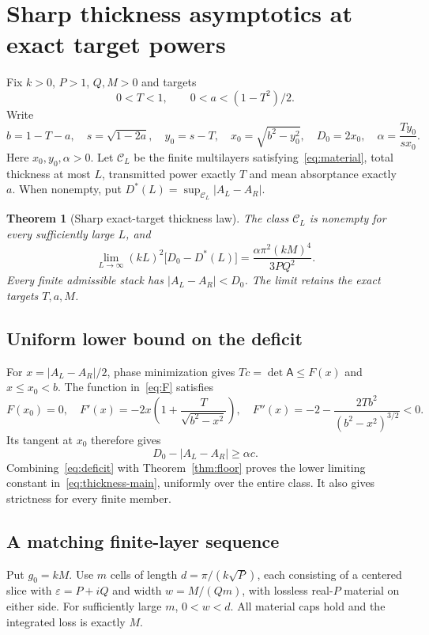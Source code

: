 \documentclass[11pt,a4paper]{article}
\newtheorem{theorem}{Theorem}[section]
\theoremstyle{remark}
\newcommand{\abs}[1]{\lvert #1\rvert}
\begin{document}
\section{Sharp thickness asymptotics at exact target powers}\label{sec:thickness}
Fix $k>0$, $P>1$, $Q,M>0$ and targets
\begin{equation}\label{eq:strict-target}
 0<T<1,\qquad 0<a<(1-T^2)/2.
\end{equation}
Write
\begin{equation}\label{eq:target-constants}
 b=1-T-a,\quad s=\sqrt{1-2a},\quad y_0=s-T,\quad
 x_0=\sqrt{b^2-y_0^2},\quad D_0=2x_0,\quad
 \alpha=\frac{Ty_0}{sx_0}.
\end{equation}
Here $x_0,y_0,\alpha>0$. Let $\mathcal C_L$ be the finite multilayers satisfying~\eqref{eq:material}, total thickness at most $L$, transmitted power exactly $T$ and mean absorptance exactly $a$. When nonempty, put $D^*(L)=\sup_{\mathcal C_L}\abs{A_L-A_R}$.

\begin{theorem}[Sharp exact-target thickness law]\label{thm:thickness}
The class $\mathcal C_L$ is nonempty for every sufficiently large $L$, and
\begin{equation}\label{eq:thickness-main}
 \lim_{L\to\infty}(kL)^2\bigl[D_0-D^*(L)\bigr]
 =\frac{\alpha\pi^2(kM)^4}{3PQ^2}.
\end{equation}
Every finite admissible stack has $\abs{A_L-A_R}<D_0$. The limit retains the exact targets $T,a,M$.
\end{theorem}

\subsection{Uniform lower bound on the deficit}
For $x=\abs{A_L-A_R}/2$, phase minimization gives $Tc=\det\mathsf A\leq F(x)$ and $x\leq x_0<b$. The function in~\eqref{eq:F} satisfies
\[
 F(x_0)=0,\quad F'(x)=-2x\left(1+\frac T{\sqrt{b^2-x^2}}\right),\quad
 F''(x)=-2-\frac{2Tb^2}{(b^2-x^2)^{3/2}}<0.
\]
Its tangent at $x_0$ therefore gives
\begin{equation}\label{eq:deficit}
 D_0-\abs{A_L-A_R}\geq\alpha c.
\end{equation}
Combining~\eqref{eq:deficit} with Theorem~\ref{thm:floor} proves the lower limiting constant in~\eqref{eq:thickness-main}, uniformly over the entire class. It also gives strictness for every finite member.

\subsection{A matching finite-layer sequence}
Put $g_0=kM$. Use $m$ cells of length $d=\pi/(k\sqrt P)$, each consisting of a centered slice with $\varepsilon=P+iQ$ and width $w=M/(Qm)$, with lossless real-$P$ material on either side. For sufficiently large $m$, $0<w<d$. All material caps hold and the integrated loss is exactly $M$.
\end{document}
